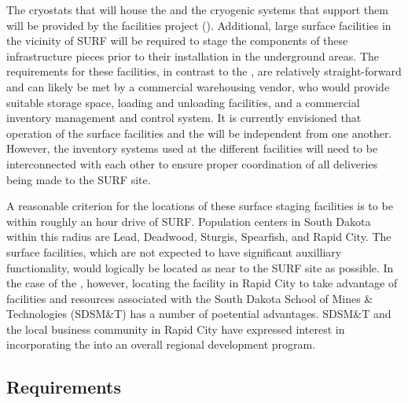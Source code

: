 The cryostats that will house the  and the cryogenic
systems that support them will be provided by the facilities project
().  Additional, large surface facilities in the vicinity
of SURF will be required to stage the components of these
infrastructure pieces prior to their installation in the underground
areas.  The requirements for these facilities, in contrast to the
, are relatively straight-forward and can likely be met by
a commercial warehousing vendor, who would provide suitable storage
space, loading and unloading facilities, and a commercial inventory
management and control system.  It is currently envisioned that
operation of the  surface facilities and the 
 will be independent from one another.  However, the
inventory systems used at the different facilities will need to be
interconnected with each other to ensure proper coordination of all
deliveries being made to the SURF site.

A reasonable criterion for the locations of these surface staging
facilities is to be within roughly an hour drive of SURF.
Population centers in South Dakota within this radius are Lead,
Deadwood, Sturgis, Spearfish, and Rapid City.  The 
surface facilities, which are not expected to have significant
auxilliary functionality, would logically be located as near to the
SURF site as possible.  In the case of the 
, however, locating the facility in Rapid City to take
advantage of facilities and resources associated with the South Dakota
School of Mines \& Technologies (SDSM\&T) has a number of poetential
advantages.  SDSM\&T and the local business community in Rapid City
have expressed interest in incorporating the  
into an overall regional development program.

\subsection{Requirements}


